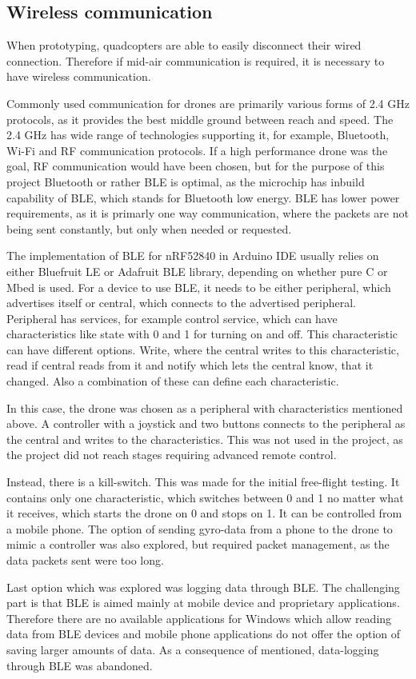 \subsection{Wireless communication}
When prototyping, quadcopters are able to easily disconnect their wired connection. Therefore if mid-air communication is required, it is necessary to have wireless communication.

Commonly used communication for drones are primarily various forms of 2.4 GHz protocols, as it provides the best middle ground between reach and speed. The 2.4 GHz has wide range of technologies supporting it, for example, Bluetooth, Wi-Fi and RF communication protocols. 
If a high performance drone was the goal, RF communication would have been chosen, but for the purpose of this project Bluetooth or rather BLE is optimal, as the microchip has inbuild capability of BLE, which stands for Bluetooth low energy. BLE has lower power requirements, as it is primarly one way communication, where the packets are not being sent constantly, but only when needed or requested.

The implementation of BLE for nRF52840 in Arduino IDE usually relies on either Bluefruit LE or Adafruit BLE library, depending on whether pure C or Mbed is used.
For a device to use BLE, it needs to be either peripheral, which advertises itself or central, which connects to the advertised peripheral. Peripheral has services, for example control service, which can have characteristics like state with 0 and 1 for turning on and off.
This characteristic can have different options. Write, where the central writes to this characteristic, read if central reads from it and notify which lets the central know, that it changed. Also a combination of these can define each characteristic.

In this case, the drone was chosen as a peripheral with characteristics mentioned above. A controller with a joystick and two buttons connects to the peripheral as the central and writes to the characteristics. This was not used in the project, as the project did not reach stages requiring advanced remote control.
 
Instead, there is a kill-switch. This was made for the initial free-flight testing. It contains only one characteristic, which switches between 0 and 1 no matter what it receives, which starts the drone on 0 and stops on 1. It can be controlled from a mobile phone. The option of sending gyro-data from a phone to the drone to mimic a controller was also explored, but required packet management, as the data packets sent were too long.

Last option which was explored was logging data through BLE. The challenging part is that BLE is aimed mainly at mobile device and proprietary applications. Therefore there are no available applications for Windows which allow reading data from BLE devices and mobile phone applications do not offer the option of saving larger amounts of data. As a consequence of mentioned, data-logging through BLE was abandoned.